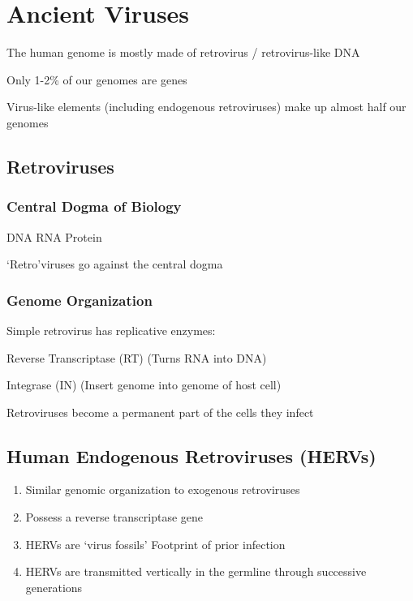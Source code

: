 \documentclass{notes}
\begin{document}
\section{Ancient Viruses}

The human genome is mostly made of retrovirus / retrovirus-like DNA

\tab Only 1-2\% of our genomes are genes

\tab Virus-like elements (including endogenous retroviruses) make up almost half our genomes

\subsection{Retroviruses}

\subsubsection{Central Dogma of Biology}

DNA \indicates RNA \indicates Protein

`Retro'viruses go against the central dogma

\subsubsection{Genome Organization}

Simple retrovirus has replicative enzymes:

\tab Reverse Transcriptase (RT) (Turns RNA into DNA)

\tab Integrase (IN) (Insert genome into genome of host cell)

\tab \indicates Retroviruses become a permanent part of the cells they infect

\subsection{Human Endogenous Retroviruses (HERVs)}

\begin{enumerate}
    \item Similar genomic organization to exogenous retroviruses
    \item Possess a reverse transcriptase gene
    \item HERVs are `virus fossils'
    \subitem Footprint of prior infection
    \item HERVs are transmitted vertically in the germline through successive generations
\end{enumerate}
\end{document}
